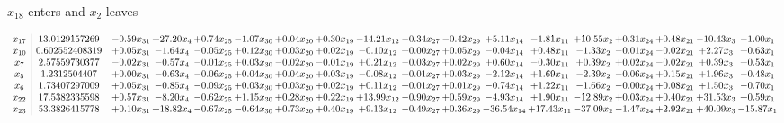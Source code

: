 \documentclass[9pt]{article}
\begin{document}
 $ x_{18} $ enters and $ x_{2} $ leaves 

 \[\begin{array}{c| c c@{\hskip 2pt} c@{\hskip 2pt} c@{\hskip 2pt} c@{\hskip 2pt} c@{\hskip 2pt} c@{\hskip 2pt} c@{\hskip 2pt} c@{\hskip 2pt} c@{\hskip 2pt} c@{\hskip 2pt} c@{\hskip 2pt} c@{\hskip 2pt} c@{\hskip 2pt} c@{\hskip 2pt} c@{\hskip 2pt} c@{\hskip 2pt} }
 x_{17}   &  13.0129157269 & -0.59 x_{31} & + 27.20 x_{4} & +  0.74 x_{25} & -1.07 x_{30} & +  0.04 x_{20} & +  0.30 x_{19} & -14.21 x_{12} & -0.34 x_{27} & -0.42 x_{29} & +  5.11 x_{14} & -1.81 x_{11} & + 10.55 x_{2} & +  0.31 x_{24} & +  0.48 x_{21} & -10.43 x_{3} & -1.00 x_{1}\\
 x_{10}   &  0.602552408319 & +  0.05 x_{31} & -1.64 x_{4} & -0.05 x_{25} & +  0.12 x_{30} & +  0.03 x_{20} & +  0.02 x_{19} & -0.10 x_{12} & +  0.00 x_{27} & +  0.05 x_{29} & -0.04 x_{14} & +  0.48 x_{11} & -1.33 x_{2} & -0.01 x_{24} & -0.02 x_{21} & +  2.27 x_{3} & +  0.63 x_{1}\\
 x_{7}   &  2.57559730377 & -0.02 x_{31} & -0.57 x_{4} & -0.01 x_{25} & +  0.03 x_{30} & -0.02 x_{20} & -0.01 x_{19} & +  0.21 x_{12} & -0.03 x_{27} & +  0.02 x_{29} & +  0.60 x_{14} & -0.30 x_{11} & +  0.39 x_{2} & +  0.02 x_{24} & -0.02 x_{21} & +  0.39 x_{3} & +  0.53 x_{1}\\
 x_{5}   &  1.2312504407 & +  0.00 x_{31} & -0.63 x_{4} & -0.06 x_{25} & +  0.04 x_{30} & +  0.04 x_{20} & +  0.03 x_{19} & -0.08 x_{12} & +  0.01 x_{27} & +  0.03 x_{29} & -2.12 x_{14} & +  1.69 x_{11} & -2.39 x_{2} & -0.06 x_{24} & +  0.15 x_{21} & +  1.96 x_{3} & -0.48 x_{1}\\
 x_{6}   &  1.73407297009 & +  0.05 x_{31} & -0.85 x_{4} & -0.09 x_{25} & +  0.03 x_{30} & +  0.03 x_{20} & +  0.02 x_{19} & +  0.11 x_{12} & +  0.01 x_{27} & +  0.01 x_{29} & -0.74 x_{14} & +  1.22 x_{11} & -1.66 x_{2} & -0.00 x_{24} & +  0.08 x_{21} & +  1.50 x_{3} & -0.70 x_{1}\\
 x_{22}   &  17.5382335598 & +  0.57 x_{31} & -8.20 x_{4} & -0.62 x_{25} & +  1.15 x_{30} & +  0.28 x_{20} & +  0.22 x_{19} & + 13.99 x_{12} & -0.90 x_{27} & +  0.59 x_{29} & -4.93 x_{14} & +  1.90 x_{11} & -12.89 x_{2} & +  0.03 x_{24} & +  0.40 x_{21} & + 31.53 x_{3} & +  0.59 x_{1}\\
 x_{23}   &  53.3826415778 & +  0.10 x_{31} & + 18.82 x_{4} & -0.67 x_{25} & -0.64 x_{30} & +  0.73 x_{20} & +  0.40 x_{19} & +  9.13 x_{12} & -0.49 x_{27} & +  0.36 x_{29} & -36.54 x_{14} & + 17.43 x_{11} & -37.09 x_{2} & -1.47 x_{24} & +  2.92 x_{21} & + 40.09 x_{3} & -15.87 x_{1}\\

\end{array}\]
\end{document}
